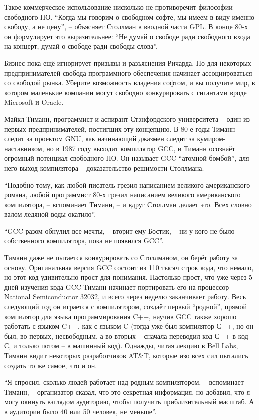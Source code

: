 Такое коммерческое использование нисколько не противоречит философии свободного ПО. \enquote{Когда мы говорим о свободном софте, мы имеем в виду именно свободу, а не цену}, -- объясняет Столлман в вводной части GPL. В конце 80-х он формулирует это выразительнее: \enquote{Не думай о свободе ради свободного входа на концерт, думай о свободе ради свободы слова}.

Бизнес пока ещё игнорирует призывы и разъяснения Ричарда. Но для некоторых предпринимателей свобода программного обеспечения начинает ассоциироваться со свободой рынка. Уберите возможность владения софтом, и вы получите мир, в котором маленькие компании могут свободно конкурировать с гигантами вроде Microsoft и Oracle.

Майкл Тиманн, программист и аспирант Стэнфордского университета -- один из первых предпринимателей, постигших эту концепцию. В 80-е годы Тиманн следит за проектом GNU, как начинающий джазмен следит за кумиром-наставником, но в 1987 году выходит компилятор GCC, и Тиманн осознаёт огромный потенциал свободного ПО. Он называет GCC \enquote{атомной бомбой}, для него выход компилятора -- доказательство решимости Столлмана.

\enquote{Подобно тому, как любой писатель грезил написанием великого американского романа, любой программист 80-х грезил написанием великого американского компилятора, -- вспоминает Тиманн, -- и вдруг Столлман делает это. Всех словно валом ледяной воды окатило}.

\enquote{GCC разом обнулил все мечты, -- вторит ему Бостик, -- ни у кого не было собственного компилятора, пока не появился GCC}.

Тиманн даже не пытается конкурировать со Столлманом, он берёт работу за основу. Оригинальная версия GCC состоит из 110 тысяч строк кода, что немало, но этот код удивительно прост для понимания. Настолько прост, что уже через 5 дней изучения кода GCC Тиманн начинает портировать его на процессор National Semiconductor 32032, и всего через неделю заканчивает работу. Весь следующий год он играется с компилятором, создаёт первый \enquote{родной}, прямой компилятор для языка программирования C++, научив GCC также хорошо работать с языком C++, как с языком C (тогда уже был компилятор С++, но он был, во-первых, несвободным, а во-вторых -- сначала переводил код С++ в код С, и только потом -- в машинный код). Однажды, читая лекцию в Bell Labs, Тиманн видит некоторых разработчиков AT\&T, которые изо всех сил пытались создать то же самое, что и он.

\enquote{Я спросил, сколько людей работает над родным компилятором, -- вспоминает Тиманн, -- организатор сказал, что это секретная информация, но добавил, что я могу окинуть взглядом аудиторию, чтобы получить приблизительный масштаб. А в аудитории было 40 или 50 человек, не меньше}.


